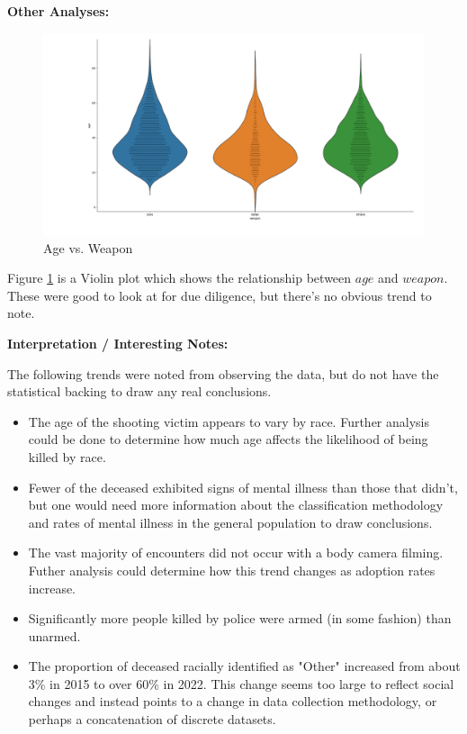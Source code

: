 \documentclass[12pt]{article}
\begin{document}
\begin{enumerate}[leftmargin=\labelsep]
  \textbf{Other Analyses:}

  \begin{figure}[htb]
    \begin{center}
      \includegraphics[width=\textwidth]{media/p2_age_vs_weapon.png}
    \end{center}
    \caption{Age vs. Weapon}
    \label{fig:p2_age_vs_weapon}
  \end{figure}

  Figure \ref{fig:p2_age_vs_weapon} is a Violin plot which shows the relationship between $age$ and $weapon$. These were good to look
  at for due diligence, but there's no obvious trend to note.
  
  \textbf{Interpretation / Interesting Notes:}

  The following trends were noted from observing the data, but do not have the statistical backing to
  draw any real conclusions.

  \begin{itemize}
    \item The age of the shooting victim appears to vary by race. Further analysis could be done to determine
      how much age affects the likelihood of being killed by race.
    \item Fewer of the deceased exhibited signs of mental illness than those that didn't, but one would need
      more information about the classification methodology and rates of mental illness in the general population
      to draw conclusions.
    \item The vast majority of encounters did not occur with a body camera filming. Futher analysis could determine
      how this trend changes as adoption rates increase.
    \item Significantly more people killed by police were armed (in some fashion) than unarmed.
    \item The proportion of deceased racially identified as "Other" increased from about 3\% in 2015 to over 60\% in 2022.
      This change seems too large to reflect social changes and instead points to a change in data collection methodology, or
      perhaps a concatenation of discrete datasets.
  \end{itemize}


\end{enumerate}
\end{document}
